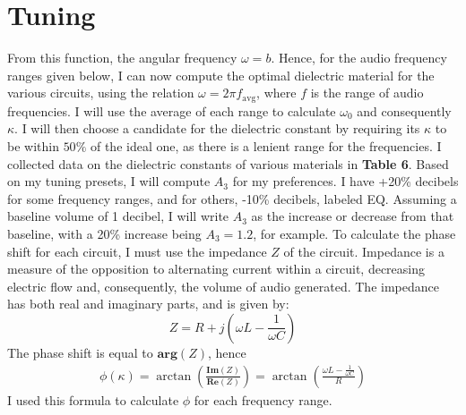 \documentclass[12pt]{article}
\numberwithin{equation}{section}
\begin{document}
\section{Tuning}
From this function, the angular frequency $\omega = b $. Hence, for the audio frequency ranges given below, I can now compute the optimal dielectric material for the various circuits, using the relation $\omega = 2\pi f_{\text{avg}}$, where $f$ is the range of audio frequencies. I will use the average of each range to calculate $\omega_{\text{0}}$ and consequently $\kappa$. I will then choose a candidate for the dielectric constant by requiring its $\kappa$ to be within $50\%$ of the ideal one, as there is a lenient range for the frequencies. I collected data on the dielectric constants of various materials in \textbf{Table 6}. Based on my tuning presets, I will compute $A_3$ for my preferences. I have +20\% decibels for some frequency ranges, and for others, -10\% decibels, labeled EQ. Assuming a baseline volume of 1 decibel, I will write $A_3$ as the increase or decrease from that baseline, with a 20\% increase being $A_3 = 1.2$, for example. To calculate the phase shift for each circuit, I must use the impedance $Z$ of the circuit. Impedance is a measure of the opposition to alternating current within a circuit, decreasing electric flow and, consequently, the volume of audio generated. The impedance has both real and imaginary parts, and is given by:
\begin{equation}
    Z = R + j\left(\omega L -\frac{1}{\omega C}        \right)
\end{equation}
\noindent The phase shift is equal to $\textbf{arg}(Z)$, hence
\begin{gather*}
    \phi(\kappa) = \arctan(\frac{\textbf{Im}(Z)}{\textbf{Re}(Z)} ) = \arctan(\frac{\omega L -\frac{1}{\omega C}}{R})
\end{gather*}
I used this formula to calculate $\phi$ for each frequency range.
\end{document}
